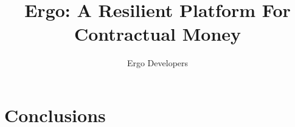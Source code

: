 \documentclass[]{article}
\begin{document}
    \title{Ergo: A Resilient Platform For Contractual Money}
    \author{Ergo Developers}


    \maketitle

    

    

    

    

    

    

    

    

    \section{Conclusions}
    \label{sec:conclusions}

    
\end{document}
